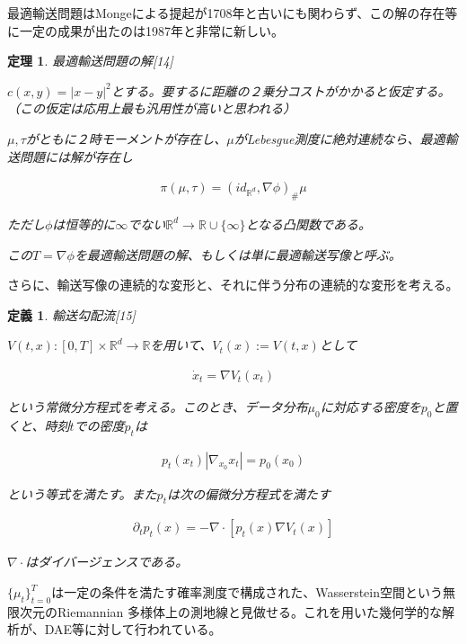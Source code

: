 \documentclass{jsarticle}
\newtheorem{theo}{定理}[section]
\newtheorem{defi}{定義}[section]
\begin{document}
最適輸送問題はMongeによる提起が1708年と古いにも関わらず、この解の存在等に一定の成果が出たのは1987年と非常に新しい。


\begin{theo} 最適輸送問題の解[14]

$c(x,y)=|x-y|^2$とする。要するに距離の２乗分コストがかかると仮定する。（この仮定は応用上最も汎用性が高いと思われる）

$\mu,\tau$がともに２時モーメントが存在し、$\mu$がLebesgue測度に絶対連続なら、最適輸送問題には解が存在し

\begin{align}
\pi(\mu,\tau)=(id_{\mathbb{R}^d},\nabla \phi)_\#\mu
\end{align}

ただし$\phi$は恒等的に$\infty$でない$\mathbb{R}^d\to\mathbb{R}\cup\{\infty\}$となる凸関数である。

この$T=\nabla \phi$を最適輸送問題の解、もしくは単に最適輸送写像と呼ぶ。

\end{theo}

さらに、輸送写像の連続的な変形と、それに伴う分布の連続的な変形を考える。

\begin{defi}輸送勾配流[15]

$V(t,x):[0,T]\times\mathbb{R}^d\to\mathbb{R}$を用いて、$V_t(x):=V(t,x)$として

\begin{align}
\dot{x}_t=\nabla V_t(x_t)
\end{align}

という常微分方程式を考える。このとき、データ分布$\mu_0$に対応する密度を$p_0$と置くと、時刻$t$での密度$p_t$は


\begin{align}
p_t(x_t)|\nabla_{x_0} x_t|=p_0(x_0)
\end{align}

という等式を満たす。また$p_t$は次の偏微分方程式を満たす

\begin{align}
\partial_t p_t(x)=-\nabla\cdot [p_t(x)\nabla V_t(x)]
\end{align}

$\nabla\cdot$はダイバージェンスである。

\end{defi}

$\{\mu_t\}^T_{t=0}$は一定の条件を満たす確率測度で構成された、Wasserstein空間という無限次元のRiemannian 多様体上の測地線と見做せる。これを用いた幾何学的な解析が、DAE等に対して行われている。
\end{document}
